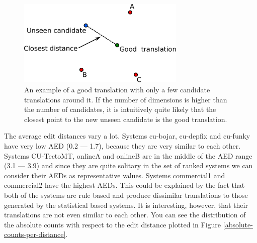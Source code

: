 \begin{figure}
    \begin{center}
        \includegraphics[width=8cm]{img/translation-space.pdf}
    \end{center}

    \caption[An illustration of a space of translations]{An example of a good
    translation with only a few candidate translations around it. If the number
  of dimensions is higher than the number of candidates, it is intuitively quite
likely that the closest point to the new unseen candidate is the good
translation.}
    \label{translation-space-illustration}
\end{figure}

The average edit distances vary a lot. Systems cu-bojar, cu-depfix and cu-funky
have very low AED (0.2 --- 1.7), because they are very similar to each other.
Systems CU-TectoMT, onlineA and onlineB are in the middle of the AED range (3.1
--- 3.9) and since they are quite solitary in the set of ranked systems we can
consider their AEDs as representative values.  Systems commercial1 and
commercial2 have the highest AEDs. This could be explained by the fact that
both of the systems are rule based and produce dissimilar translations to those
generated by the statistical based systems. It is interesting, however, that
their translations are not even similar to each other. You can see the distribution of the absolute
counts with respect to the edit distance plotted in Figure
\ref{absolute-counts-per-distance}.

